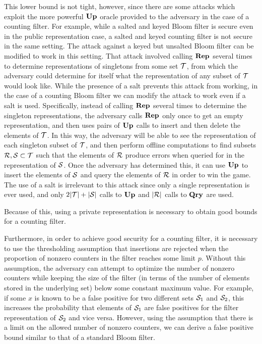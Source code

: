 This lower bound is not tight, however, since there are some attacks which
exploit the more powerful $\mathbf{Up}\hspace{0.5pt}$ oracle provided to the adversary in the case of
a counting filter. For example, while a salted and keyed Bloom filter is secure even in the public representation case, a salted and keyed counting filter is not secure in the same setting. The attack against a keyed but unsalted Bloom filter can be modified to work in this setting. That attack involved calling $\mathbf{Rep}\hspace{0.5pt}$ several times to determine representations of singletons from some set $\mathcal{T}$, from which the adversary could determine for itself what the representation of any subset of $\mathcal{T}$ would look like. While the presence of a salt prevents this attack from working, in the case of a counting Bloom filter we can modify the attack to work even if a salt is used. Specifically, instead of calling $\mathbf{Rep}\hspace{0.5pt}$ several times to determine the singleton representations, the adversary calls $\mathbf{Rep}\hspace{0.5pt}$ only once to get an empty representation, and then uses pairs of $\mathbf{Up}\hspace{0.5pt}$ calls to insert and then delete the elements of $\mathcal{T}$. In this way, the adversary will be able to see the representation of each singleton subset of $\mathcal{T}$, and then perform offline computations to find subsets $\mathcal{R}, \mathcal{S} \subset \mathcal{T}$ such that the elements of $\mathcal{R}$ produce errors when queried for in the representation of $\mathcal{S}$. Once the adversary has determined this, it can use $\mathbf{Up}\hspace{0.5pt}$ to insert the elements of $\mathcal{S}$ and query the elements of $\mathcal{R}$ in order to win the game. The use of a salt is irrelevant to this attack since only a single representation is ever used, and only $2|\mathcal{T}|+|\mathcal{S}|$ calls to $\mathbf{Up}\hspace{0.5pt}$ and $|\mathcal{R}|$ calls to $\mathbf{Qry}\hspace{0.5pt}$ are used.

Because of this, using a private representation is necessary to obtain good bounds for a counting filter.

Furthermore, in order to achieve good security for a counting filter, it is necessary to use
the thresholding assumption that insertions are rejected when the proportion of
nonzero counters in the filter reaches some limit $p$. Without this assumption,
the adversary can attempt to optimize the number of nonzero counters while
keeping the size of the filter (in terms of the number of elements stored in the
underlying set) below some constant maximum value. For example, if some $x$ is
known to be a false positive for two different sets $\mathcal{S}_1$ and $\mathcal{S}_2$, this
increases the probability that elements of $\mathcal{S}_1$ are false positives for the
filter representation of $\mathcal{S}_2$ and vice versa. However, using the assumption
that there is a limit on the allowed number of nonzero counters, we can derive a
false positive bound similar to that of a standard Bloom filter.

